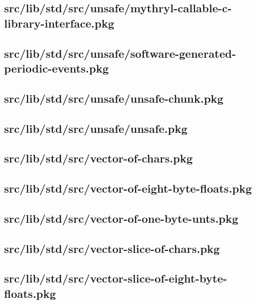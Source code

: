 \subsection{src/lib/std/src/unsafe/mythryl-callable-c-library-interface.pkg}


\subsection{src/lib/std/src/unsafe/software-generated-periodic-events.pkg}


\subsection{src/lib/std/src/unsafe/unsafe-chunk.pkg}


\subsection{src/lib/std/src/unsafe/unsafe.pkg}


\subsection{src/lib/std/src/vector-of-chars.pkg}


\subsection{src/lib/std/src/vector-of-eight-byte-floats.pkg}


\subsection{src/lib/std/src/vector-of-one-byte-unts.pkg}


\subsection{src/lib/std/src/vector-slice-of-chars.pkg}


\subsection{src/lib/std/src/vector-slice-of-eight-byte-floats.pkg}


